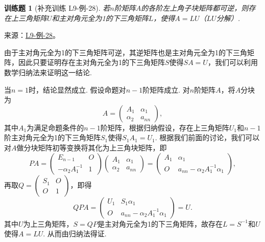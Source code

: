\documentclass[12pt,fontset=fandol]{ctexart}
\newtheorem{exercise}{训练题}[section]
\begin{document}
\begin{exercise}[补充训练 L9-例-28]\label{prob:L9-例-28}
若$n$阶矩阵$A$的各阶左上角子块矩阵都可逆，则存在上三角矩阵$U$和主对角元全为1的下三角矩阵$L$，使得$A=LU$（$LU$分解）.
\end{exercise}
\noindent 来源：\href{https://github.com/yhwu-is/Linear-Algebra-Left-Undone/blob/new/%E8%AE%B2%E4%B9%89/%E4%B8%93%E9%A2%98/9%20%E7%9F%A9%E9%98%B5%E8%BF%90%E7%AE%97%E8%BF%9B%E9%98%B6.tex}{L9-例-28}。
\begin{solve}
由于主对角元全为1的下三角矩阵可逆，其逆矩阵也是主对角元全为1的下三角矩阵，因此只要证明存在主对角元全为1的下三角矩阵$S$使得$SA=U$，我们可以利用数学归纳法来证明这一结论.

    当$n=1$时，结论显然成立. 假设命题对$n-1$阶矩阵成立. 对$n$阶矩阵$A$，将$A$分块为
    \[A=\begin{pmatrix}
            A_1 & \alpha_1 \\ \alpha_2 & a_{nn}
        \end{pmatrix},\]
    其中$A_1$为满足命题条件的$n-1$阶矩阵，根据归纳假设，存在上三角矩阵$U_1$和$n-1$阶主对角元全为1的下三角矩阵$S_1$使得$S_1A_1=U_1$. 根据我们前面的讨论，我们可以对$A$做分块矩阵初等变换将其化为上三角块矩阵，即
    \[PA=\begin{pmatrix}
            E_{n-1} & O \\ -\alpha_2A_1^{-1} & 1
        \end{pmatrix}\begin{pmatrix}
            A_1 & \alpha_1 \\ \alpha_2 & a_{nn}
        \end{pmatrix}=\begin{pmatrix}
            A_1 & \alpha_1 \\ O & a_{nn}-\alpha_2A_1^{-1}\alpha_1
        \end{pmatrix},\]
    再取$Q=\begin{pmatrix}
            S_1 & O \\ O & 1
        \end{pmatrix}$，即得
    \[QPA=\begin{pmatrix}
            U_1 & S_1\alpha_1 \\ O & a_{nn}-\alpha_2A_1^{-1}\alpha_1
        \end{pmatrix}=U.\]
    其中$U$为上三角矩阵，$S=QP$是主对角元全为1的下三角矩阵，故存在$L=S^{-1}$和$U$使得$A=LU$. 从而由归纳法得证.
\end{solve}
\end{document}
